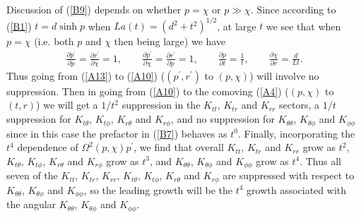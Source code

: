 Discussion of (\ref{B9}) depends on whether $p=\chi$ or $p\gg \chi$. Since according to (\ref{B1}) $t=d\sinh p$ when $La(t)=(d^2+t^2)^{1/2}$, at large $t$ we see that  when $p=\chi$ (i.e. both $p$ and $\chi$ then being large) we have 
%
\begin{eqnarray}
\frac{\partial p^{\prime }}{\partial p}=\frac{\partial r^{\prime }}{\partial \chi}=1,\qquad
\frac{\partial p^{\prime }}{\partial \chi}=\frac{\partial r^{\prime }}{\partial p}=1,\qquad \frac{\partial p}{\partial t}=\frac{1}{t},\qquad \frac{\partial \chi}{\partial r}=\frac{d}{Lt}.
\label{B10}
\end{eqnarray}
%
Thus going from (\ref{A13}) to (\ref{A10}) ($(p^{\prime},r^{\prime})$ to $(p,\chi)$) will involve no suppression. Then in going from (\ref{A10}) to the comoving (\ref{A4}) ($(p,\chi)$ to $(t,r)$) we will get a $1/t^2$ suppression in the $K_{tt}$, $K_{tr}$ and $K_{rr}$ sectors, a $1/t$ suppression for $K_{t\theta}$, $K_{t\phi}$, $K_{r\theta}$ and $K_{r\phi}$, and no suppression for $K_{\theta\theta}$, $K_{\theta\phi}$ and $K_{\phi\phi}$ since in this case the prefactor in (\ref{B7}) behaves as $t^0$. Finally, incorporating the $t^4$ dependence of $\Omega^2(p,\chi)p^{\prime}$, we find that overall $K_{tt}$, $K_{tr}$ and $K_{rr}$  grow as $t^2$, $K_{t\theta}$, $K_{t\phi}$, $K_{r\theta}$ and $K_{r\phi}$ grow as $t^3$, and $K_{\theta\theta}$, $K_{\theta\phi}$ and $K_{\phi\phi}$ grow as $t^4$. Thus all seven of the $K_{tt}$, $K_{tr}$, $K_{rr}$, $K_{t\theta}$, $K_{t\phi}$, $K_{r\theta}$ and $K_{r\phi}$ are suppressed with respect to $K_{\theta\theta}$, $K_{\theta\phi}$ and $K_{\phi\phi}$, so the leading growth will be the $t^4$ growth associated with the angular $K_{\theta\theta}$, $K_{\theta\phi}$ and $K_{\phi\phi}$. 


